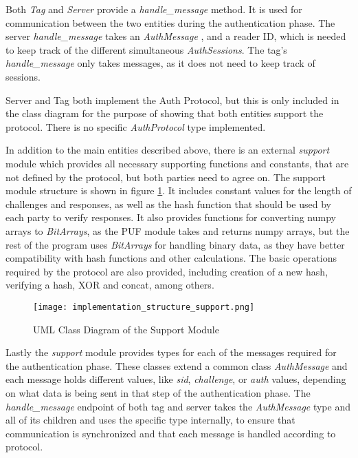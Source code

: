 Both \emph{Tag} and \emph{Server} provide a \emph{handle\_message} method.
It is used for communication between the two entities during the authentication phase.
The server \emph{handle\_message} takes an \emph{AuthMessage} , and a reader ID, which is needed to keep track of the different
simultaneous \emph{AuthSessions}. The tag's \emph{handle\_message} only takes messages, as it does not need to
keep track of sessions.

Server and Tag both implement the Auth Protocol, but this is only included in the class diagram for the purpose of
showing that both entities support the protocol. There is no specific \emph{AuthProtocol} type implemented.

In addition to the main entities described above, there is an external \emph{support} module which provides
all necessary supporting functions and constants, that are not defined by the protocol, but both parties need
to agree on.
The support module structure is shown in figure \ref{fig:implementation_structure_support}.
It includes constant values for the length of challenges and responses, as well as the hash function that
should be used by each party to verify responses.
It also provides functions for converting numpy arrays to \emph{BitArrays}, as the PUF module takes and returns
numpy arrays, but the rest of the program uses \emph{BitArrays} for handling binary data, as they
have better compatibility with hash functions and other calculations.
The basic operations required by the protocol are also provided, including creation of
a new hash, verifying a hash, XOR and concat, among others.

\begin{figure}[H]
    \centering
    \caption{UML Class Diagram of the Support Module}
    \label{fig:implementation_structure_support}
    \texttt{[image: implementation\_structure\_support.png]}
\end{figure}

Lastly the \emph{support} module provides types for each of the messages required for the authentication phase.
These classes extend a common class \emph{AuthMessage} and each message holds different values, like \emph{sid}, \emph{challenge},
or \emph{auth} values, depending on what data is being sent in that step of the authentication phase.
The \emph{handle\_message} endpoint of both tag and server takes the \emph{AuthMessage} type and all of its children
and uses the specific type internally, to ensure that communication is synchronized and that
each message is handled according to protocol.

